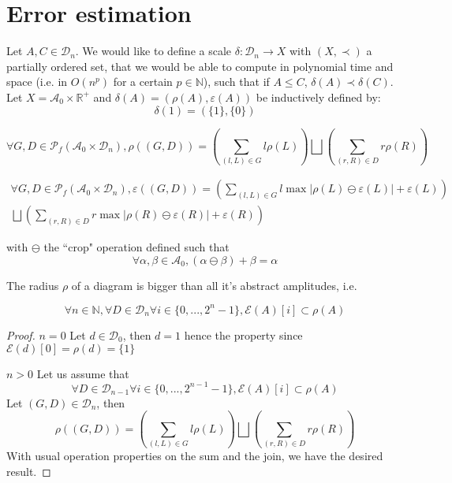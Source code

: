 \section{Error estimation}

Let $A, C \in \mathcal{D}_n$.
We would like to define a scale $\delta : \mathcal{D}_n \rightarrow X$ with $(X, \prec)$ a partially ordered set, that we would be able to compute in polynomial time and space (i.e. in $O(n^p)$ for a certain $p \in \mathbb{N}$), such that if $A \le C$, $\delta(A) \prec \delta(C)$.
Let $X = \mathcal{A}_0 \times \mathbb{R}^+$ and $\delta(A) = (\rho(A), \varepsilon(A))$ be inductively defined by:
$$\delta(\boxed{1}) = (\{1\}, \{0\})$$

$$\forall G, D \in \mathscr{P}_f(\mathcal{A}_0 \times \mathcal{D}_n),
\rho((G, D))
= \left(\sum_{(l, L) \in G} l \rho(L) \right) \bigsqcup \left(\sum_{(r, R) \in D} r \rho(R) \right)$$

\begin{multline*}
\forall G, D \in \mathscr{P}_f(\mathcal{A}_0 \times \mathcal{D}_n),
\varepsilon((G, D))
= \left(\sum_{(l, L) \in G} l \max|\rho(L) \ominus \varepsilon(L)| + \varepsilon(L)\right) \\
\bigsqcup \left(\sum_{(r, R) \in D} r \max|\rho(R) \ominus \varepsilon(R)| + \varepsilon(R)\right)
\end{multline*}

\noindent with $\ominus$ the “crop" operation defined such that
$$\forall \alpha, \beta \in \mathcal A_0, (\alpha \ominus \beta) + \beta = \alpha$$

\begin{prop}
    The radius $\rho$ of a diagram is bigger than all it's abstract amplitudes, i.e.

    $$
        \forall n \in \mathbb N,
        \forall D \in \mathcal{D}_n
        \forall i \in \{0, ..., 2^n-1\},
        \mathcal E(A)[i] \subset \rho(A)
    $$

    \begin{proof}
        $\boxed{n = 0}$
            Let $d \in \mathcal{D}_0$,
            then $d = \boxed{1}$
            hence the property since $\mathcal E(d)[0] = \rho(d) = \{1\}$

        \noindent $\boxed{n > 0}$
            Let us assume that
            $$\forall D \in \mathcal{D}_{n-1}
            \forall i \in \{0, ..., 2^{n-1}-1\},
            \mathcal E(A)[i] \subset \rho(A)$$
            Let $(G, D) \in \mathcal{D}_n$, then
            $$\rho((G, D))
            = \left(\sum_{(l, L) \in G} l \rho(L) \right) \bigsqcup \left(\sum_{(r, R) \in D} r \rho(R) \right)$$
            With usual operation properties on the sum and the join, we have the desired result.
        \end{proof}
\end{prop}

